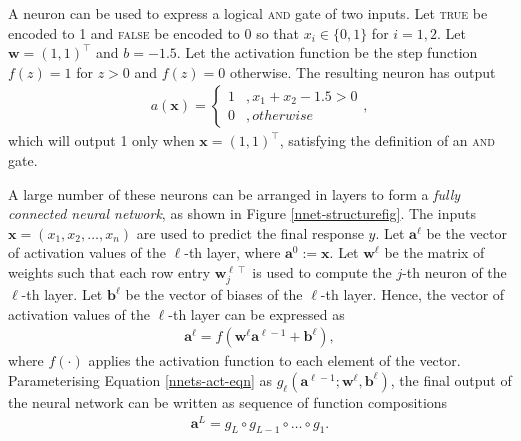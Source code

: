 
\begin{example}
\label{nnets-and-eg}
A neuron can be used to express a logical \textsc{and} gate of two inputs. Let \textsc{true} be encoded to 1 and \textsc{false} be encoded to 0 so that $x_i \in \{0,1\}$ for $i=1,2$. Let $\mathbf{w} = (1, 1)^\intercal$ and $b = -1.5$. Let the activation function be the step function $f(z) = 1$ for $z > 0$ and $f(z) = 0$ otherwise. The resulting neuron has output
\begin{align}
	a(\mathbf{x}) = \begin{cases}
		1 & ,x_1 + x_2 - 1.5 > 0\\
		0 & ,otherwise
	\end{cases},
\end{align}
which will output 1 only when $\mathbf{x} = (1, 1)^\intercal$, satisfying the definition of an \textsc{and} gate.
\end{example}


A large number of these neurons can be arranged in layers to form a \textit{fully connected neural network}, as shown in Figure \ref{nnet-structurefig}. The inputs $\mathbf{x} = (x_1, x_2, \ldots, x_n)$ are used to predict the final response $y$. Let $\mathbf{a}^\ell$ be the vector of activation values of the $\ell$-th layer, where $\mathbf{a}^0 := \mathbf{x}$. Let $\mathbf{w}^\ell$ be the matrix of weights such that each row entry $\mathbf{w}_j^{\ell\intercal}$ is used to compute the $j$-th neuron of the $\ell$-th layer. Let $\mathbf{b}^\ell$ be the vector of biases of the $\ell$-th layer. Hence, the vector of activation values of the $\ell$-th layer can be expressed as
\begin{align}\label{nnets-act-eqn}
	\mathbf{a}^\ell = f(\mathbf{w}^\ell \mathbf{a}^{\ell - 1} + \mathbf{b}^\ell),
\end{align}
where $f(\cdot)$ applies the activation function to each element of the vector. Parameterising Equation \eqref{nnets-act-eqn} as $g_\ell(\mathbf{a}^{\ell - 1}; \mathbf{w}^\ell, \mathbf{b}^\ell)$, the final output of the neural network can be written as sequence of function compositions
\begin{align}
	\mathbf{a}^L = g_L \circ g_{L-1} \circ \ldots \circ g_1.
\end{align}

